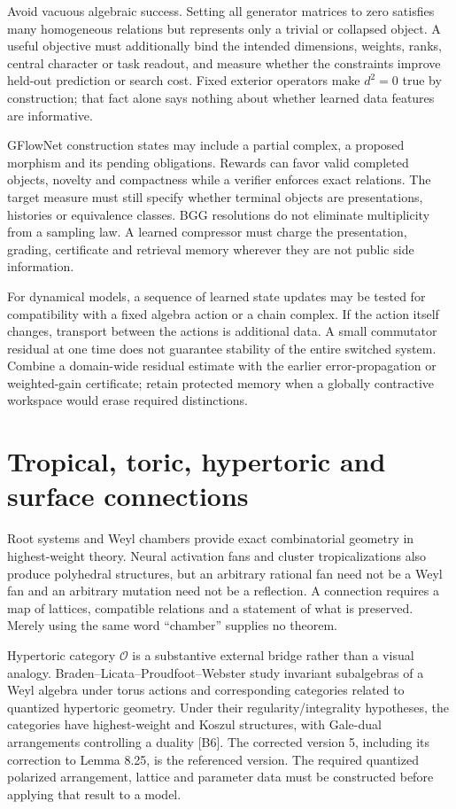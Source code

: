 Avoid vacuous algebraic success. Setting all generator matrices to zero satisfies many homogeneous relations but represents only a trivial or collapsed object. A useful objective must additionally bind the intended dimensions, weights, ranks, central character or task readout, and measure whether the constraints improve held-out prediction or search cost. Fixed exterior operators make $d^2=0$ true by construction; that fact alone says nothing about whether learned data features are informative.

GFlowNet construction states may include a partial complex, a proposed morphism and its pending obligations. Rewards can favor valid completed objects, novelty and compactness while a verifier enforces exact relations. The target measure must still specify whether terminal objects are presentations, histories or equivalence classes. BGG resolutions do not eliminate multiplicity from a sampling law. A learned compressor must charge the presentation, grading, certificate and retrieval memory wherever they are not public side information.

For dynamical models, a sequence of learned state updates may be tested for compatibility with a fixed algebra action or a chain complex. If the action itself changes, transport between the actions is additional data. A small commutator residual at one time does not guarantee stability of the entire switched system. Combine a domain-wide residual estimate with the earlier error-propagation or weighted-gain certificate; retain protected memory when a globally contractive workspace would erase required distinctions.

\section{Tropical, toric, hypertoric and surface connections}
\label{sec:wb-bgg-geometry}

Root systems and Weyl chambers provide exact combinatorial geometry in highest-weight theory. Neural activation fans and cluster tropicalizations also produce polyhedral structures, but an arbitrary rational fan need not be a Weyl fan and an arbitrary mutation need not be a reflection. A connection requires a map of lattices, compatible relations and a statement of what is preserved. Merely using the same word ``chamber'' supplies no theorem.

Hypertoric category $\mathcal O$ is a substantive external bridge rather than a visual analogy. Braden--Licata--Proudfoot--Webster study invariant subalgebras of a Weyl algebra under torus actions and corresponding categories related to quantized hypertoric geometry. Under their regularity/integrality hypotheses, the categories have highest-weight and Koszul structures, with Gale-dual arrangements controlling a duality [B6]. The corrected version 5, including its correction to Lemma 8.25, is the referenced version. The required quantized polarized arrangement, lattice and parameter data must be constructed before applying that result to a model.

